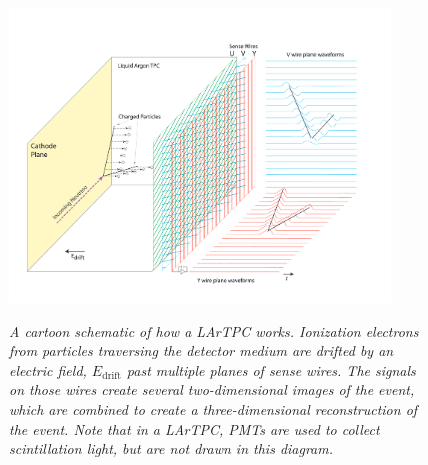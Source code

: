 \begin{figure}[ht!]
\centering
	\includegraphics[width=0.9\textwidth]{Figures/LArTPC_concept.png} \\
\caption{\textit{A cartoon schematic of how a LArTPC works. Ionization electrons from particles traversing the detector medium are drifted by an electric field, $E_{\text{drift}}$ past multiple planes of sense wires. The signals on those wires create several two-dimensional images of the event, which are combined to create a three-dimensional reconstruction of the event. Note that in a LArTPC, PMTs are used to collect scintillation light, but are not drawn in this diagram.}}\label{LArTPC_concept_fig}
\end{figure}



